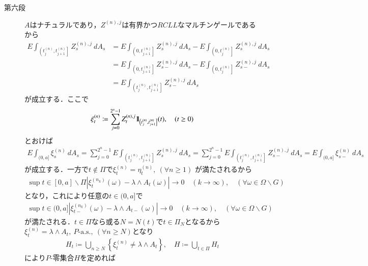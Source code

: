 \begin{prf}
\begin{description}
			\item[第六段]
				$A$はナチュラルであり，$Z^{(n),j}$は有界かつ$RCLL$なマルチンゲールであるから
				\begin{align}
					E\int_{\left(t^{(n)}_j,t^{(n)}_{j+1}\right]} Z^{(n),j}_s\ dA_s
					&= E\int_{\left(0,t^{(n)}_{j+1}\right]} Z^{(n),j}_s\ dA_s
						- E\int_{\left(0,t^{(n)}_j\right]} Z^{(n),j}_s\ dA_s \\
					&= E\int_{\left(0,t^{(n)}_{j+1}\right]} Z^{(n),j}_{s-}\ dA_s
						- E\int_{\left(0,t^{(n)}_j\right]} Z^{(n),j}_{s-}\ dA_s \\
					&= E\int_{\left(t^{(n)}_j,t^{(n)}_{j+1}\right]} Z^{(n),j}_{s-}\ dA_s
				\end{align}
				が成立する．ここで
				\begin{align}
					\xi^{(n)}_t \coloneqq
					\sum_{j=0}^{2^n-1} Z^{(n),j}_t \mbox{1}\hspace{-0.25em}\mbox{l}_{\left(t^{(n)}_j,t^{(n)}_{j+1}\right]}(t),
					\quad (t \geq 0)
				\end{align}
				とおけば
				\begin{align}
					E\int_{(0,a]} \xi^{(n)}_s\ dA_s
					= \sum_{j=0}^{2^n-1} E\int_{\left(t^{(n)}_j,t^{(n)}_{j+1}\right]} Z^{(n),j}_s\ dA_s
					= \sum_{j=0}^{2^n-1} E\int_{\left(t^{(n)}_j,t^{(n)}_{j+1}\right]} Z^{(n),j}_{s-}\ dA_s
					= E\int_{(0,a]} \xi^{(n)}_{s-}\ dA_s
				\end{align}
				が成立する．一方で$t \notin \Pi$で$\xi^{(n)}_t = \eta^{(n)}_t,\ (\forall n \geq 1)$
				が満たされるから
				\begin{align}
					\sup{t \in [0,a]\backslash\Pi}{\left|\xi^{(n_k)}_t(\omega) - \lambda \wedge A_t(\omega)\right|}
					\longrightarrow 0 \quad (k \longrightarrow \infty),
					\quad (\forall \omega \in \Omega \backslash G)
				\end{align}
				となり，これにより任意の$t \in (0,a]$で
				\begin{align}
					\sup{t \in (0,a]}{\left|\xi^{(n_k)}_{t-}(\omega) - \lambda \wedge A_{t-}(\omega)\right|}
					\longrightarrow 0 \quad (k \longrightarrow \infty),
					\quad (\forall \omega \in \Omega \backslash G)
				\end{align}
				が満たされる．$t \in \Pi$なら或る$N = N(t)$で$t \in \Pi_N$となるから
				$\xi^{(n)}_t = \lambda \wedge A_t,\ \mbox{$P$-a.s.},\ (\forall n \geq N)$となり
				\begin{align}
					H_t \coloneqq \bigcup_{n \geq N} \left\{\xi^{(n)}_t \neq \lambda \wedge A_t\right\},
					\quad H \coloneqq \bigcup_{t \in \Pi} H_t
				\end{align}
				により$P$-零集合$H$を定めれば

\end{description}
\end{prf}
